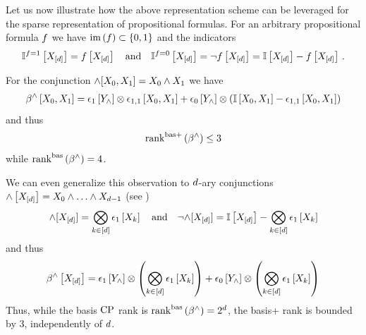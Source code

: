 \begin{example}
    Let us now illustrate how the above representation scheme can be leveraged for the sparse representation of propositional formulas.
    For an arbitrary propositional formula $f$ we have $\mathrm{im}\left(f\right)\subset\{0,1\}$ and the indicators
    \begin{align*}
        \mathbb{I}^{f=1}\left[X_{[d]}\right] = f\left[X_{[d]}\right] \quad\text{and}\quad
        \mathbb{I}^{f=0}\left[X_{[d]}\right] = \lnot f\left[X_{[d]}\right] = \mathbb{I}\left[X_{[d]}\right] - f\left[X_{[d]}\right] \, .
    \end{align*}

    For the conjunction $\land[X_{0},X_{1}] = X_{0} \land X_{1}$ we have
    \begin{align*}
        \bencodingofat{\land}{\catvariableof{0},\catvariableof{1}}
        = \tbasisat{\headvariableof{\land}} \otimes \onehotmapofat{1,1}{\catvariableof{0},\catvariableof{1}}
        + \fbasisat{\headvariableof{\land}} \otimes (\onesat{\catvariableof{0},\catvariableof{1}} - \onehotmapofat{1,1}{\catvariableof{0},\catvariableof{1}})
    \end{align*}
    and thus
    \begin{align*}
        \mathrm{rank}^{\mathrm{bas+}}\left(\beta^{\land}\right) \leq 3
    \end{align*}
    while $\mathrm{rank}^{\mathrm{bas}}\left(\beta^{\land}\right) = 4$.

    We can even generalize this observation to $d$-ary conjunctions $\land\left[X_{[d]}\right]=X_{0}\land\ldots\land X_{d-1}$ (see )
    \begin{align*}
    {\land}[X_{[d]}]
        = \bigotimes_{k\in[d]} \epsilon_{1}\left[X_{k}\right]
        \quad\text{and}\quad
        {\lnot\land}[X_{[d]}] = \mathbb{I}\left[X_{[d]}\right] - \bigotimes_{k\in[d]} \epsilon_{1}\left[X_{k}\right]
    \end{align*}
    and thus
    \begin{align*}
        \bencodingofat{\land}{\shortcatvariables} =
        \tbasisat{\headvariableof{\land}} \otimes \left(\bigotimes_{\catenumeratorin} \tbasisat{\catvariableof{\catenumerator}}\right)
        + \fbasisat{\headvariableof{\land}} \otimes \left(\bigotimes_{\catenumeratorin} \tbasisat{\catvariableof{\catenumerator}}\right)
    \end{align*}
    Thus, while the basis $\mathrm{CP}$ rank is $\mathrm{rank}^{\mathrm{bas}}\left(\beta^{\land}\right)=2^{d}$, the basis+ rank is bounded by $3$, independently of $d$.
\end{example}






